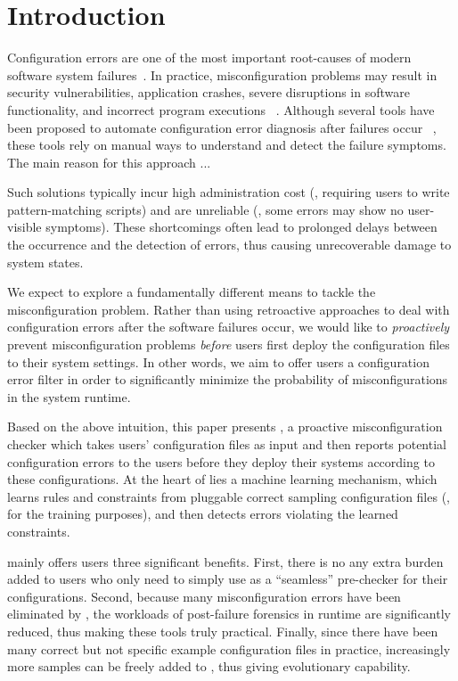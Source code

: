 \section{Introduction}

Configuration errors are one of the most important root-causes of 
modern software system failures~\cite{xu15systems,yin11anempirical}. 
In practice, misconfiguration problems may result in 
security vulnerabilities,
application crashes, severe disruptions in software functionality,
and incorrect program executions%
~\cite{xu15systems,zhang14encore,yuan11context}.
Although several tools have been proposed to automate configuration
error diagnosis after failures occur%
~\cite{wang04automatic,attariyan10automating,%
su07autobash,whitaker04configuration}, 
these tools rely on manual ways to understand and detect the failure symptoms. The main reason for this approach ... 




Such solutions typically incur high administration cost (\eg, 
requiring users to write pattern-matching scripts) 
and are unreliable (\eg, some errors may show no user-visible symptoms).
These shortcomings often lead to prolonged delays between
the occurrence and the detection of errors, thus causing unrecoverable
damage to system states.

We expect to explore a fundamentally different means to tackle 
the misconfiguration problem. Rather than using retroactive approaches
to deal with configuration errors after the software failures occur, 
we would like to {\em proactively} prevent misconfiguration problems 
{\em before} users first deploy the configuration files to 
their system settings. In other words, we aim to offer users 
a configuration error filter in order to significantly minimize 
the probability of misconfigurations in the system runtime.

Based on the above intuition, this paper presents \app, 
a proactive misconfiguration checker which takes users' 
configuration files as input and then reports potential configuration 
errors to the users before they deploy their systems 
according to these configurations.
At the heart of \app lies a machine learning mechanism, 
which learns rules and constraints from pluggable 
correct sampling configuration files (\ie, for the training purposes), 
and then detects errors violating the learned constraints.

\app mainly offers users three significant benefits.
First, there is no any extra burden added to users who only need to 
simply use \app as a ``seamless'' pre-checker for their configurations.
Second, because many misconfiguration errors have been eliminated 
by \app, the workloads of post-failure forensics in runtime
are significantly reduced, thus making these tools truly practical.
Finally, since there have been many correct but not specific 
example configuration files in practice, 
increasingly more samples can be freely added to \app,
thus giving \app evolutionary capability.

